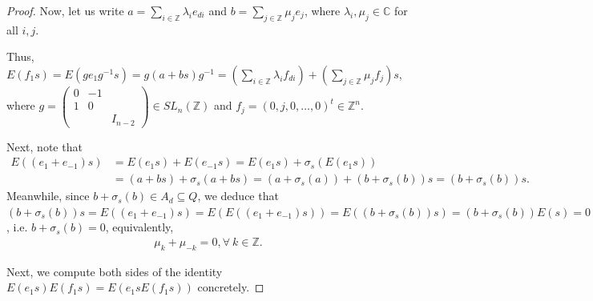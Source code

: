 \documentclass[12pt]{amsart}
\theoremstyle{definition}
\theoremstyle{remark}
\begin{document}
\begin{proof}
Now, let us write $a=\sum_{i\in\mathbb{Z}}\lambda_ie_{di}$ and $b=\sum_{j\in\mathbb{Z}}\mu_je_j$, where $\lambda_i,\mu_j\in \mathbb{C}$ for all $i, j$.

Thus, $E(f_1s)=E(ge_{1}g^{-1}s) = g(a+bs)g^{-1}=(\sum_{i\in\mathbb{Z}}\lambda_if_{di})+(\sum_{j\in\mathbb{Z}}\mu_jf_j)s$, where $g = \left(\begin{smallmatrix}
 0 & -1 \\
1 & 0 \\
     & & I_{n-2}
\end{smallmatrix}\right)\in SL_{n}(\mathbb{Z})$ and $f_j=(0,j,0,\ldots, 0)^t\in\mathbb{Z}^n$.

Next, note that
\begin{align*}
E((e_1+e_{-1})s)&=E(e_1s)+E(e_{-1}s)=E(e_1s)+\sigma_s(E(e_1s))\\
&=(a+bs)+\sigma_s(a+bs)
=(a+\sigma_s(a))+(b+\sigma_s(b))s=(b+\sigma_s(b))s.
\end{align*}
Meanwhile, since $b+\sigma_s(b)\in A_d\subseteq Q$, we deduce that $(b+\sigma_s(b))s=E((e_1+e_{-1})s)=E(E((e_1+e_{-1})s))=E((b+\sigma_s(b))s)=(b+\sigma_s(b))E(s)=0$, i.e. $b+\sigma_s(b)=0$, equivalently, 
\begin{align}\label{eq: skew-symmetry on coefficients of b}
\mu_k+\mu_{-k}=0, \forall ~k\in \mathbb{Z}.
\end{align}

Next, we compute both sides of the identity $E(e_1s)E(f_1s)=E(e_1sE(f_1s))$ concretely.


\end{proof}
\end{document}
